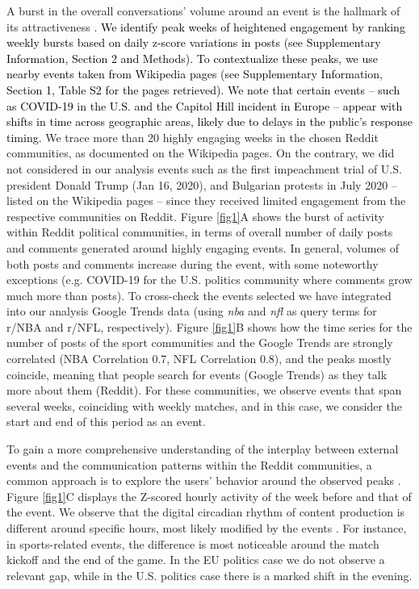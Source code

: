 \documentclass[fleqn,10pt]{wlscirep}
\newcommand{\new}[1]{\textcolor{black}{#1}}
\begin{document}
A burst in the overall conversations' volume around an event is the hallmark of its attractiveness \cite{wu2007novelty,sasahara2013quantifying}.
\new{
We identify peak weeks of heightened engagement by ranking weekly bursts based on daily z-score variations in posts (see Supplementary Information, Section 2 and Methods).
To contextualize these peaks, we use nearby events taken from Wikipedia pages (see Supplementary Information, Section 1, Table S2 for the pages retrieved). We note  that certain events -- such as COVID-19 in the U.S. and the Capitol Hill incident in Europe -- appear with shifts in time across geographic areas, likely due to delays in the public's response timing.
}
We trace more than 20 highly engaging weeks in the chosen Reddit communities, as documented on the Wikipedia pages.
On the contrary, we did not considered in our analysis events such as the first impeachment trial of U.S. president Donald Trump (Jan 16, 2020), and Bulgarian protests in July 2020 -- listed on the Wikipedia pages -- since they received limited engagement from the respective communities on Reddit.
Figure \ref{fig1}A shows the burst of activity within Reddit political communities, in terms of overall number of daily posts and comments generated around highly engaging events.
In general, volumes of both posts and comments increase during the event, with some noteworthy exceptions (e.g. COVID-19 for the U.S. politics community where comments grow much more than posts). 
To cross-check the events selected we have integrated into our analysis Google Trends data (using \emph{nba} and \emph{nfl} as query terms for r/NBA and r/NFL, respectively).
Figure \ref{fig1}B shows how the time series for the number of posts of the sport communities and the Google Trends are strongly correlated (NBA Correlation 0.7, NFL Correlation 0.8), and the peaks mostly coincide, meaning that people search for events (Google Trends) as they talk more about them (Reddit).
For these communities, we observe events that span several weeks, coinciding with weekly matches, and in this case, we consider the start and end of this period as an event.

To gain a more comprehensive understanding of the interplay between external events and the communication patterns within the Reddit communities, a common approach is to explore the users' behavior around the observed peaks \cite{he2017measuring,sasahara2013quantifying}.
Figure \ref{fig1}C displays the Z-scored hourly activity of the week before and that of the event. 
We observe that the digital circadian rhythm of content production is different around specific hours, most likely modified by the events \cite{sasahara2013quantifying}. 
For instance, in sports-related events, the difference is most noticeable around the match kickoff and the end of the game.
In the EU politics case we do not observe a relevant gap, while in the U.S. politics case there is a marked shift in the evening. 
\end{document}
